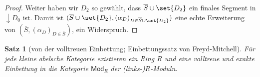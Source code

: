 \documentclass[a4paper, parskip=half,11pt]{scrartcl}
\theoremstyle{marginbreak}
\newtheorem{theorem}[remark]{Satz}
\theoremstyle{nonumberplain}
\newtheorem{proof}{Beweis.}
\newtheorem{overview}{Übersicht.}
\newcommand\ccat\mathsf
\newcommand\cat\mathcal
\newcommand{\down}[1]{{\downarrow}#1}
\renewcommand{\o}[1]{\iftoggle{overviews}{#1}{}}
\newcommand{\n}{\pgfmatrixnextcell}
\newcommand\nat\Rightarrow
\DeclareMathOperator{\colim}{colim}
\DeclareMathOperator{\id}{id}
\begin{document}
{\begin{proof}
			Weiter haben wir $D_2$ so gewählt, dass $\overline{S}\cup\set{D_2}$ ein finales
			Segment in $\down{D_0}$ ist. Damit ist $(\overline{S}\cup\set{D_2}, (\alpha_D)_{D\in\overline{S}\cup\set{D_2}})$
			eine echte Erweiterung von $(\overline{S}, (\alpha_D)_{D\in\overline{S}})$,
			ein Widerspruch.
		\end{proof}}
		\begin{theorem}[von der volltreuen Einbettung; Einbettungssatz von Freyd-Mitchell]
			Für jede kleine abelsche Kategorie existieren ein Ring $R$ und eine volltreue
			und exakte Einbettung in die Kategorie $\ccat{Mod}_R$ der (links-)$R$-Moduln.
		\end{theorem}
\end{document}
